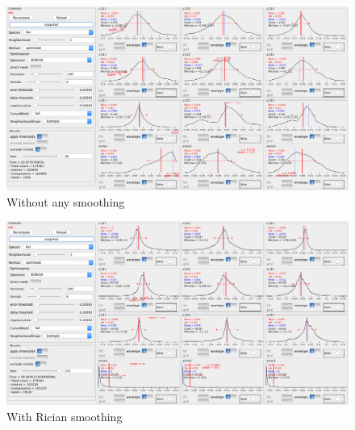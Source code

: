 \begin{figure}
    \centering
    \includegraphics[width=\textwidth]{figures/histogram_pig6_no_smooth}
    \caption{Without any smoothing}
    \label{fig:histogram_pig6_no_smooth}
\end{figure}
\begin{figure}
    \centering
    \includegraphics[width=\textwidth]{figures/histogram_pig6_smooth}
    \caption{With Rician smoothing}
    \label{fig:histogram_pig6_smooth}
\end{figure}

